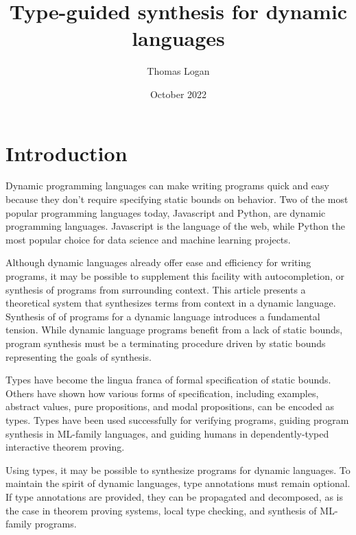 \documentclass[]{acmart}
\title{Type-guided synthesis for dynamic languages}
\author{Thomas Logan}
\date{October 2022}
\begin{document}
\maketitle

\section{Introduction}
Dynamic programming languages can make writing programs quick and easy 
because they don't require specifying static bounds on behavior.
Two of the most popular programming languages today, Javascript and Python,  are 
dynamic programming languages. 
Javascript is the language of the web, while Python the most popular choice
for data science and machine learning projects. 

Although dynamic languages already offer ease and efficiency for writing programs, it
may be possible to supplement this facility with autocompletion,
or synthesis of programs from surrounding context. 
This article presents a theoretical system that synthesizes terms from context 
in a dynamic language.
Synthesis of of programs for a dynamic language introduces a fundamental tension. 
While dynamic language programs benefit from a lack of static bounds, program synthesis
must be a terminating procedure driven by static bounds representing the goals of synthesis.   

Types have become the lingua franca of formal specification of static bounds.
Others have shown how various forms of specification, including examples, abstract values, 
pure propositions, and modal propositions, can be encoded as types.
Types have been used successfully for verifying programs, 
guiding program synthesis in ML-family languages, 
and guiding humans in dependently-typed interactive theorem proving. 

Using types, it may be possible to synthesize programs for dynamic languages.
To maintain the spirit of dynamic languages, type annotations must remain optional.
If type annotations are provided, they can be propagated and decomposed, 
as is the case in theorem proving systems, local type checking, and synthesis of ML-family programs.
\end{document}
